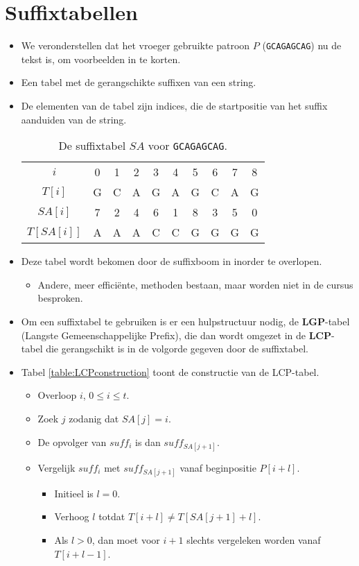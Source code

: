 \section{Suffixtabellen}
\begin{itemize}
    \item We veronderstellen dat het vroeger gebruikte patroon $P$ (\texttt{GCAGAGCAG}) nu de tekst is, om voorbeelden in te korten.
    \item Een tabel met de gerangschikte suffixen van een string.
    \item De elementen van de tabel zijn indices, die de startpositie van het suffix aanduiden van de string.
    \begin{table}[ht]
        \centering
        \begin{tabular}{|c|ccccccccc|}
            \hline
            $i$&0&1&2&3&4&5&6&7&8\\
            $T[i]$&G&C&A&G&A&G&C&A&G\\
            \hline
            $SA[i]$&7&2&4&6&1&8&3&5&0\\
            $T[SA[i]]$&A&A&A&C&C&G&G&G&G\\
            \hline
        \end{tabular}
        \caption{De suffixtabel $SA$ voor \texttt{GCAGAGCAG}.}
        \label{table:suffixtabel}
    \end{table}
    \item Deze tabel wordt bekomen door de suffixboom in inorder te overlopen. 
    \begin{itemize}
        \item Andere, meer efficiënte, methoden bestaan, maar worden niet in de cursus besproken.
    \end{itemize}
    \item Om een suffixtabel te gebruiken is er een hulpstructuur nodig, de \textbf{LGP}-tabel (Langste Gemeenschappelijke Prefix), die dan wordt omgezet in de \textbf{LCP}-tabel die gerangschikt is in de volgorde gegeven door de suffixtabel.
    
    \item Tabel \ref{table:LCPconstruction} toont de constructie van de LCP-tabel.
    \begin{itemize}
        \item Overloop $i$, $0 \leq i \leq t$.
        \item Zoek $j$ zodanig dat $SA[j] = i$.
        \item De opvolger van $suff_i$ is dan $suff_{SA[j + 1]}$.
        \item Vergelijk $suff_i$  met $suff_{SA[j + 1]}$ vanaf beginpositie $P[i + l]$.
        \begin{itemize}
            \item Initieel is $l = 0$.
            \item Verhoog $l$ totdat $T[i + l] \neq T[SA[j + 1] + l]$.
            \item Als $l > 0$, dan moet voor $i + 1$ slechts vergeleken worden vanaf $T[i + l - 1]$.
        \end{itemize}
    \end{itemize}
    

\end{itemize}
